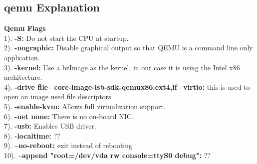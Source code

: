 \documentclass[letterpaper,10pt]{article}
\begin{document}
\subsection{qemu Explanation}
{\bfseries Qemu Flags}\\
1). {\textbf{-S:}} Do not start the CPU at startup.\\
2). {\textbf{-nographic:}} Disable graphical output so that QEMU is a command line only application.\\
3). {\textbf{-kernel:}} Use a bzImage as the kernel, in our case it is using the Intel x86 architecture.\\
4). {\textbf{-drive file=core-image-lsb-sdk-qemux86.ext4,if=virtio:}} this is used to open an image used file descriptors\\
5). {\textbf{-enable-kvm:}} Allows full virtualization support.\\
6). {\textbf{-net none:}} There is no on-board NIC.\\
7). {\textbf{-usb:}} Enables USB driver.\\
8). {\textbf{-localtime:}} ??\\
9). {\textbf{--no-reboot:}} exit instead of rebooting\\
10). {\textbf{--append "root=/dev/vda rw console=ttyS0 debug":}} ??\\\\

\end{document}

